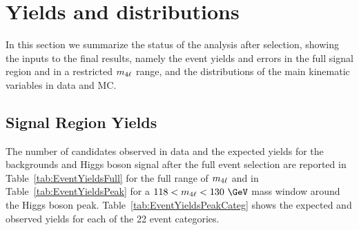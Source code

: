 \section{Yields and distributions}

In this section we summarize the status of the analysis after selection, showing the inputs to the final results, namely the event yields and errors in the full signal region and in a restricted  $m_{4\ell}$ range, and the distributions of the main kinematic variables in data and MC. 

\subsection{Signal Region Yields}

The number of candidates observed in data and the expected yields for the backgrounds and Higgs boson signal after the full event selection are reported in Table~\ref{tab:EventYieldsFull} for the full range of $m_{4\ell}$ and in Table~\ref{tab:EventYieldsPeak} for a $118<\mllll<130~\GeV$ mass window around the Higgs boson peak.
Table~\ref{tab:EventYieldsPeakCateg} shows the expected and observed yields for each of the 22 event categories.

